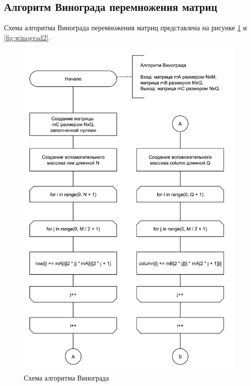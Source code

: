 \newpage

\subsection{Алгоритм Винограда перемножения матриц}

Схема алгоритма Винограда перемножения матриц представлена на рисунке \ref{fig:winograd1} и \ref{fig:winograd2}.

\begin{figure}
	\centering
	\includegraphics[width=0.75\linewidth]{images/winograd1}
	\caption{Схема алгоритма Винограда}
	\label{fig:winograd1}
\end{figure}

\newpage

